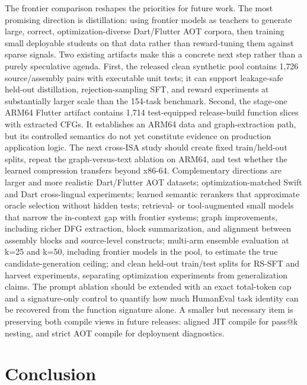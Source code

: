 \documentclass[11pt]{article}
\begin{document}
The frontier comparison reshapes the priorities for future work. The most promising direction is distillation: using frontier models as teachers to generate large, correct, optimization-diverse Dart/Flutter AOT corpora, then training small deployable students on that data rather than reward-tuning them against sparse signals. Two existing artifacts make this a concrete next step rather than a purely speculative agenda. First, the released clean synthetic pool contains 1{,}726 source/assembly pairs with executable unit tests; it can support leakage-safe held-out distillation, rejection-sampling SFT, and reward experiments at substantially larger scale than the 154-task benchmark. Second, the stage-one ARM64 Flutter artifact contains 1{,}714 test-equipped release-build function slices with extracted CFGs. It establishes an ARM64 data and graph-extraction path, but its controlled semantics do not yet constitute evidence on production application logic. The next cross-ISA study should create fixed train/held-out splits, repeat the graph-versus-text ablation on ARM64, and test whether the learned compression transfers beyond x86-64. Complementary directions are larger and more realistic Dart/Flutter AOT datasets; optimization-matched Swift and Dart cross-lingual experiments; learned semantic rerankers that approximate oracle selection without hidden tests; retrieval- or tool-augmented small models that narrow the in-context gap with frontier systems; graph improvements, including richer DFG extraction, block summarization, and alignment between assembly blocks and source-level constructs; multi-arm ensemble evaluation at k=25 and k=50, including frontier models in the pool, to estimate the true candidate-generation ceiling; and clean held-out train/test splits for RS-SFT and harvest experiments, separating optimization experiments from generalization claims. The prompt ablation should be extended with an exact total-token cap and a signature-only control to quantify how much HumanEval task identity can be recovered from the function signature alone. A smaller but necessary item is preserving both compile views in future releases: aligned JIT compile for pass@k nesting, and strict AOT compile for deployment diagnostics.

\section{Conclusion}
\end{document}
